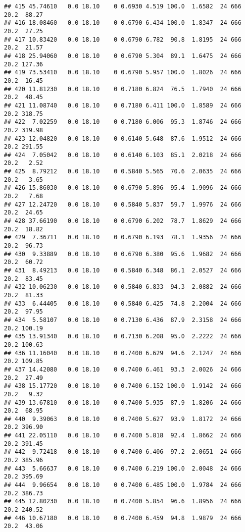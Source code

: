 \documentclass[
]{article}
\begin{document}
\begin{verbatim}
## 415 45.74610   0.0 18.10    0 0.6930 4.519 100.0  1.6582  24 666    20.2  88.27
## 416 18.08460   0.0 18.10    0 0.6790 6.434 100.0  1.8347  24 666    20.2  27.25
## 417 10.83420   0.0 18.10    0 0.6790 6.782  90.8  1.8195  24 666    20.2  21.57
## 418 25.94060   0.0 18.10    0 0.6790 5.304  89.1  1.6475  24 666    20.2 127.36
## 419 73.53410   0.0 18.10    0 0.6790 5.957 100.0  1.8026  24 666    20.2  16.45
## 420 11.81230   0.0 18.10    0 0.7180 6.824  76.5  1.7940  24 666    20.2  48.45
## 421 11.08740   0.0 18.10    0 0.7180 6.411 100.0  1.8589  24 666    20.2 318.75
## 422  7.02259   0.0 18.10    0 0.7180 6.006  95.3  1.8746  24 666    20.2 319.98
## 423 12.04820   0.0 18.10    0 0.6140 5.648  87.6  1.9512  24 666    20.2 291.55
## 424  7.05042   0.0 18.10    0 0.6140 6.103  85.1  2.0218  24 666    20.2   2.52
## 425  8.79212   0.0 18.10    0 0.5840 5.565  70.6  2.0635  24 666    20.2   3.65
## 426 15.86030   0.0 18.10    0 0.6790 5.896  95.4  1.9096  24 666    20.2   7.68
## 427 12.24720   0.0 18.10    0 0.5840 5.837  59.7  1.9976  24 666    20.2  24.65
## 428 37.66190   0.0 18.10    0 0.6790 6.202  78.7  1.8629  24 666    20.2  18.82
## 429  7.36711   0.0 18.10    0 0.6790 6.193  78.1  1.9356  24 666    20.2  96.73
## 430  9.33889   0.0 18.10    0 0.6790 6.380  95.6  1.9682  24 666    20.2  60.72
## 431  8.49213   0.0 18.10    0 0.5840 6.348  86.1  2.0527  24 666    20.2  83.45
## 432 10.06230   0.0 18.10    0 0.5840 6.833  94.3  2.0882  24 666    20.2  81.33
## 433  6.44405   0.0 18.10    0 0.5840 6.425  74.8  2.2004  24 666    20.2  97.95
## 434  5.58107   0.0 18.10    0 0.7130 6.436  87.9  2.3158  24 666    20.2 100.19
## 435 13.91340   0.0 18.10    0 0.7130 6.208  95.0  2.2222  24 666    20.2 100.63
## 436 11.16040   0.0 18.10    0 0.7400 6.629  94.6  2.1247  24 666    20.2 109.85
## 437 14.42080   0.0 18.10    0 0.7400 6.461  93.3  2.0026  24 666    20.2  27.49
## 438 15.17720   0.0 18.10    0 0.7400 6.152 100.0  1.9142  24 666    20.2   9.32
## 439 13.67810   0.0 18.10    0 0.7400 5.935  87.9  1.8206  24 666    20.2  68.95
## 440  9.39063   0.0 18.10    0 0.7400 5.627  93.9  1.8172  24 666    20.2 396.90
## 441 22.05110   0.0 18.10    0 0.7400 5.818  92.4  1.8662  24 666    20.2 391.45
## 442  9.72418   0.0 18.10    0 0.7400 6.406  97.2  2.0651  24 666    20.2 385.96
## 443  5.66637   0.0 18.10    0 0.7400 6.219 100.0  2.0048  24 666    20.2 395.69
## 444  9.96654   0.0 18.10    0 0.7400 6.485 100.0  1.9784  24 666    20.2 386.73
## 445 12.80230   0.0 18.10    0 0.7400 5.854  96.6  1.8956  24 666    20.2 240.52
## 446 10.67180   0.0 18.10    0 0.7400 6.459  94.8  1.9879  24 666    20.2  43.06

\end{verbatim}
\end{document}
